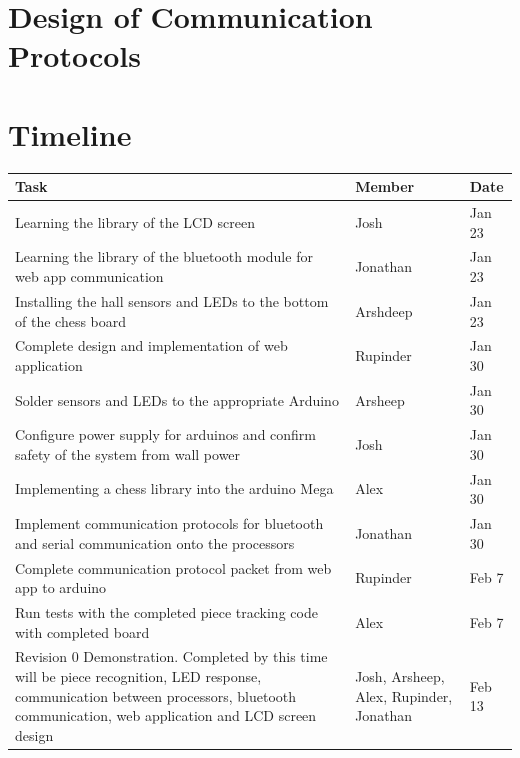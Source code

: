 \documentclass[12pt, titlepage]{article}
\begin{document}

\section{Design of Communication Protocols}


\section{Timeline}
\begin{table}[H]
  \centering
      \setlength{\leftmargini}{0.4cm}
      \begin{tabular}{| >{\centering\arraybackslash}m{10cm} | 
        >{\centering\arraybackslash}m{2cm} | 
        >{\centering\arraybackslash}m{1.5cm} |}
      \hline
      \rowcolor[gray]{0.9}
      Task & Member & Date\\
      \hline 
      Learning the library of the LCD screen & Josh & Jan 23\\
      \hline
      Learning the library of the bluetooth module for web app communication & Jonathan & Jan 23\\
      \hline 
      Installing the hall sensors and LEDs to the bottom of the chess board & Arshdeep & Jan 23\\
      \hline
      Complete design and implementation of web application & Rupinder & Jan 30\\
      \hline 
      Solder sensors and LEDs to the appropriate Arduino & Arsheep & Jan 30\\
      \hline 
      Configure power supply for arduinos and confirm safety of the system from wall power & Josh & Jan 30\\
      \hline
      Implementing a chess library into the arduino Mega & Alex & Jan 30\\
      \hline 
      Implement communication protocols for bluetooth and serial communication onto the processors & Jonathan
      & Jan 30\\
      \hline 
      Complete communication protocol packet from web app to arduino & Rupinder & Feb 7\\
      \hline 
      Run tests with the completed piece tracking code with completed board & Alex & Feb 7\\
      \hline 
      Revision 0 Demonstration. Completed by this time will be piece recognition, LED response, communication 
      between processors, bluetooth communication, web application and LCD screen design
      & Josh, Arsheep, Alex, Rupinder, Jonathan & Feb 13\\
      \hline
      
      \end{tabular}
  \label{Table}
  \end{table}
\end{document}
